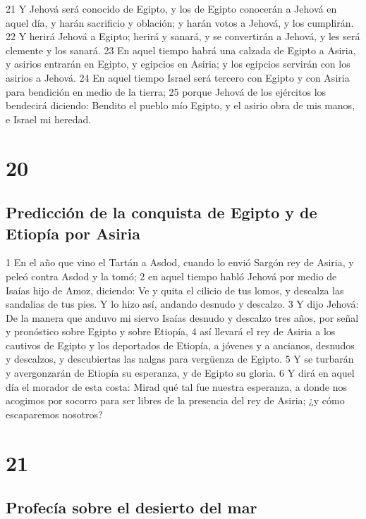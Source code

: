 21 Y Jehová será conocido de Egipto, y los de Egipto conocerán a Jehová en aquel día, y harán sacrificio y oblación; y harán votos a Jehová, y los cumplirán.
22 Y herirá Jehová a Egipto; herirá y sanará, y se convertirán a Jehová, y les será clemente y los sanará.
23 En aquel tiempo habrá una calzada de Egipto a Asiria, y asirios entrarán en Egipto, y egipcios en Asiria; y los egipcios servirán con los asirios a Jehová.
24 En aquel tiempo Israel será tercero con Egipto y con Asiria para bendición en medio de la tierra;
25 porque Jehová de los ejércitos los bendecirá diciendo: Bendito el pueblo mío Egipto, y el asirio obra de mis manos, e Israel mi heredad. 


\chapter{20}

\section*{Predicción de la conquista de Egipto y de Etiopía por Asiria}

1 En el año que vino el Tartán a Asdod, cuando lo envió Sargón rey de Asiria, y peleó contra Asdod y la tomó;
2 en aquel tiempo habló Jehová por medio de Isaías hijo de Amoz, diciendo: Ve y quita el cilicio de tus lomos, y descalza las sandalias de tus pies. Y lo hizo así, andando desnudo y descalzo.
3 Y dijo Jehová: De la manera que anduvo mi siervo Isaías desnudo y descalzo tres años, por señal y pronóstico sobre Egipto y sobre Etiopía,
4 así llevará el rey de Asiria a los cautivos de Egipto y los deportados de Etiopía, a jóvenes y a ancianos, desnudos y descalzos, y descubiertas las nalgas para vergüenza de Egipto.
5 Y se turbarán y avergonzarán de Etiopía su esperanza, y de Egipto su gloria.
6 Y dirá en aquel día el morador de esta costa: Mirad qué tal fue nuestra esperanza, a donde nos acogimos por socorro para ser libres de la presencia del rey de Asiria; ¿y cómo escaparemos nosotros?

\chapter{21}

\section*{Profecía sobre el desierto del mar}

